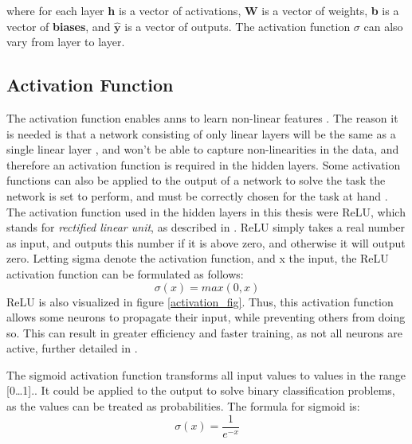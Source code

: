         where for each layer \textbf{h} is a vector of activations, \textbf{W} is a vector of weights, \textbf{b} is a  vector of \textbf{biases}, and $\hat{\textbf{y}}$ is a vector of outputs. The activation function $\sigma$ can also vary from layer to layer.
        
        
    \subsection{Activation Function} \label{activation function}
        The activation function enables \gls{ann}s to learn non-linear features \cite{razavi2021deep_exp_per}. The reason it is needed is that a network consisting of only linear layers will be the same as a single linear layer \cite{razavi2021deep_exp_per}, and won't be able to capture non-linearities in the data, and therefore an activation function is required in the hidden layers. Some activation functions can also be applied to the output of a network to solve the task the network is set to perform, and must be correctly chosen for the task at hand \cite{Goodfellow-et-al-2016_out_activation}. The activation function used in the hidden layers in this thesis were ReLU, which stands for \textit{rectified linear unit}, as described in \citeauthor{sharma2019new_activation_func}\cite{sharma2019new_activation_func}. ReLU simply takes a real number as input, and outputs this number if it is above zero, and otherwise it will output zero. Letting sigma denote the activation function, and x the input, the ReLU activation function can be formulated as follows:
            \begin{equation} \label{relu_eq}
                \sigma(x) = max(0,x)
            \end{equation}
        ReLU is also visualized in figure \ref{activation_fig}. Thus, this activation function allows some neurons to propagate their input, while preventing others from doing so. This can result in greater efficiency and faster training, as not all neurons are active, further detailed in \citeauthor{sharma2019new_activation_func}\cite{sharma2019new_activation_func}. 
        
        The sigmoid activation function transforms all input values to values in the range [0…1].\cite{sharma2019new_activation_func}. It could be applied to the output to solve binary classification problems, as the values can be treated as probabilities. The formula for sigmoid is:
            \begin{equation} \label{sigmoid_eq}
                \sigma(x) = \dfrac{1}{e^{-x}} 
            \end{equation}
            
